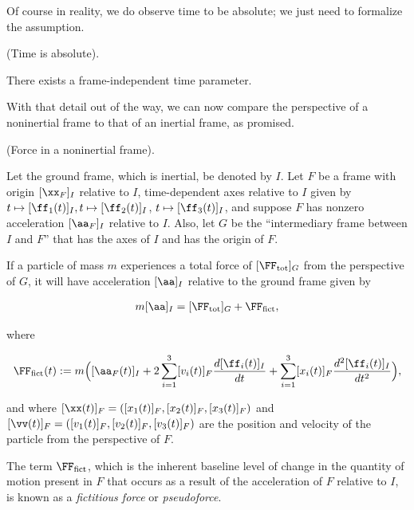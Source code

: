 \documentclass{article}
\begin{document}
Of course in reality, we do observe time to be absolute; we just need to formalize the assumption.

\begin{axiom}
	(Time is absolute).
	
	There exists a frame-independent time parameter.
\end{axiom}


With that detail out of the way, we can now compare the perspective of a noninertial frame to that of an inertial frame, as promised.

\begin{theorem}
	(Force in a noninertial frame).
	
	Let the ground frame, which is inertial, be denoted by $I$. Let $F$ be a frame with origin $[\xx_F]_I$ relative to $I$, time-dependent axes relative to $I$ given by $t \mapsto [\ff_1(t)]_I, t \mapsto [\ff_2(t)]_I$, $t \mapsto [\ff_3(t)]_I$, and suppose $F$ has nonzero acceleration $[\aa_F]_I$ relative to $I$. Also, let $G$ be the ``intermediary frame between $I$ and $F$'' that has the axes of $I$ and has the origin of $F$.
	
	If a particle of mass $m$ experiences a total force of $[\FF_{\text{tot}}]_G$ from the perspective of $G$, it will have acceleration $[\aa]_I$ relative to the ground frame given by
	
	\begin{align*}
		m[\aa]_I = [\FF_{\text{tot}}]_G + \FF_{\text{fict}},
	\end{align*}

	where
	
	\begin{align*}
		\FF_{\text{fict}}(t) := m\Big([\aa_F(t)]_I +
		2 \sum_{i = 1}^3 [v_i(t)]_F \frac{d[\ff_i(t)]_I}{dt} + \sum_{i = 1}^3 [x_i(t)]_F \frac{d^2 [\ff_i(t)]_I}{dt^2} \Big),
	\end{align*}
	
	and where $[\xx(t)]_F = ([x_1(t)]_F, [x_2(t)]_F, [x_3(t)]_F)$ and $[\vv(t)]_F = ([v_1(t)]_F, [v_2(t)]_F, [v_3(t)]_F)$ are the position and velocity of the particle from the perspective of $F$.
	
	The term $\FF_{\text{fict}}$, which is the inherent baseline level of change in the quantity of motion present in $F$ that occurs as a result of the acceleration of $F$ relative to $I$, is known as a \textit{fictitious force} or \textit{pseudoforce}.
\end{theorem}
\end{document}
